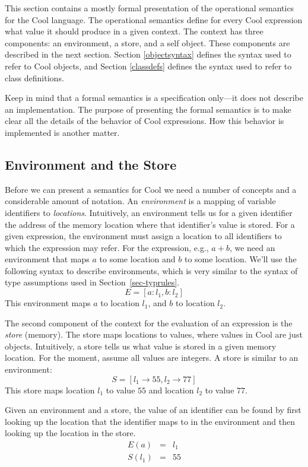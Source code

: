 \documentclass[11pt]{article}
\begin{document}
This section contains a mostly formal presentation of the operational
semantics for the Cool language. The operational semantics define for
every Cool expression what value it should produce in a given context.
The context has three components: an environment, a store, and a self
object. These components are described in the next section. Section
\ref{objectsyntax} defines the syntax used to refer to Cool
objects, and Section \ref{classdefs} defines the syntax used to refer to
class definitions.

Keep in mind that a formal semantics is a specification only---it does
not describe an implementation.  The purpose of presenting the formal
semantics is to make clear all the details of the behavior of Cool 
expressions.  How this behavior is implemented is another matter.

\subsection{Environment and the Store}

Before we can present a semantics for Cool we need a number
of concepts and a considerable amount of notation.
An {\em environment} is a mapping of variable identifiers to
{\em locations}.  Intuitively, an environment tells us for a given
identifier the address of the memory location where that identifier's
value is stored.  For a given expression, the environment must
assign a location to all identifiers to which the expression may refer.
 For the expression, e.g., $a + b$, we need an environment that maps
$a$ to some location and $b$ to some location. We'll use the following syntax
to describe environments, which is very similar to the syntax of type
assumptions used in Section~\ref{sec-typrules}.
\[
	E = [ a:l_1, b:l_2]
\]
This environment maps $a$ to location $l_1$, and $b$ to location
$l_2$.

The second component of the context for the evaluation of an
expression is the {\em store} (memory). The store maps locations to values,
where values in Cool are just objects.  Intuitively, a store
tells us what value is stored in a given memory location.
For the moment, assume all values are integers.
A store is similar to an environment:
\[
	S = [ l_1\rightarrow 55, l_2\rightarrow 77 ]
\]
This store maps location $l_1$ to value $55$ and location $l_2$
to value $77$.

Given an environment and a store, the value of an
identifier can be found by first looking up the location that the identifier maps
to in the environment and then looking up the location in the store. 
\[
\begin{array}{rcl}
	E(a) &=& l_1 \\
	S(l_1) & = & 55
\end{array}
\]
\end{document}
